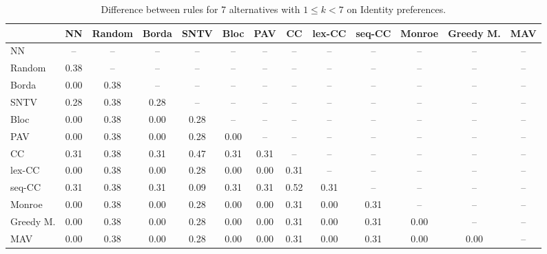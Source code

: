 
\begin{table*}[h!]
\centering
\begin{tabular}{lcccccccccccc}
\toprule
 & NN & Random & Borda & SNTV & Bloc & PAV & CC & lex-CC & seq-CC & Monroe & Greedy M. & MAV \\
\midrule
NN & -- & -- & -- & -- & -- & -- & -- & -- & -- & -- & -- & -- \\
Random & 0.38 & -- & -- & -- & -- & -- & -- & -- & -- & -- & -- & -- \\
Borda & 0.00 & 0.38 & -- & -- & -- & -- & -- & -- & -- & -- & -- & -- \\
SNTV & 0.28 & 0.38 & 0.28 & -- & -- & -- & -- & -- & -- & -- & -- & -- \\
Bloc & 0.00 & 0.38 & 0.00 & 0.28 & -- & -- & -- & -- & -- & -- & -- & -- \\
PAV & 0.00 & 0.38 & 0.00 & 0.28 & 0.00 & -- & -- & -- & -- & -- & -- & -- \\
CC & 0.31 & 0.38 & 0.31 & 0.47 & 0.31 & 0.31 & -- & -- & -- & -- & -- & -- \\
lex-CC & 0.00 & 0.38 & 0.00 & 0.28 & 0.00 & 0.00 & 0.31 & -- & -- & -- & -- & -- \\
seq-CC & 0.31 & 0.38 & 0.31 & 0.09 & 0.31 & 0.31 & 0.52 & 0.31 & -- & -- & -- & -- \\
Monroe & 0.00 & 0.38 & 0.00 & 0.28 & 0.00 & 0.00 & 0.31 & 0.00 & 0.31 & -- & -- & -- \\
Greedy M. & 0.00 & 0.38 & 0.00 & 0.28 & 0.00 & 0.00 & 0.31 & 0.00 & 0.31 & 0.00 & -- & -- \\
MAV & 0.00 & 0.38 & 0.00 & 0.28 & 0.00 & 0.00 & 0.31 & 0.00 & 0.31 & 0.00 & 0.00 & -- \\
\bottomrule
\end{tabular}

\caption{Difference between rules for 7 alternatives with $1 \leq k < 7$ on Identity preferences.}
\end{table*}
